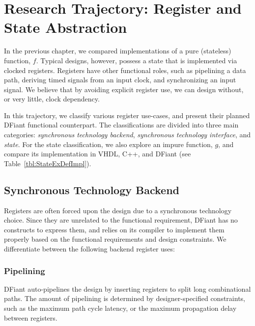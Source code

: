 \chapter{Research Trajectory: Register and State Abstraction}
\label{chap:state_abstractions}
In the previous chapter, we compared implementations of a pure (stateless) function, $f$. Typical designs, however, possess a state that is implemented via clocked registers. Registers have other functional roles, such as pipelining a data path, deriving timed signals from an input clock, and synchronizing an input signal. We believe that by avoiding explicit register use, we can design without, or very little, clock dependency. 

In this trajectory, we classify various register use-cases, and present their planned DFiant functional counterpart. The classifications are divided into three main categories: \textit{synchronous technology backend}, \textit{synchronous technology interface}, and \textit{state}. For the state classification, we also explore an impure function, $g$, and compare its implementation in VHDL, C++, and DFiant (see Table~\ref{tbl:StateExDefImpl}).


\section{Synchronous Technology Backend}
Registers are often forced upon the design due to a synchronous technology choice. Since they are unrelated to the functional requirement, DFiant has no constructs to express them, and relies on its compiler to implement them properly based on the functional requirements and design constraints.
We differentiate between the following backend register uses:
\subsection{Pipelining}
DFiant auto-pipelines the design by inserting registers to split long combinational paths. The amount of pipelining is determined by designer-specified constraints, such as the maximum path cycle latency, or the maximum propagation delay between registers. 


